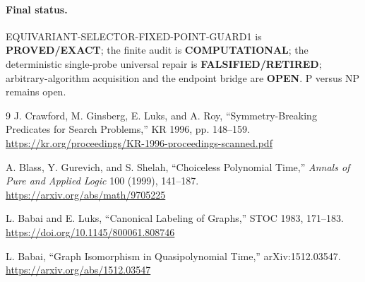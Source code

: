 \documentclass[11pt]{article}
\begin{document}
\paragraph{Final status.}
EQUIVARIANT-SELECTOR-FIXED-POINT-GUARD1 is \textbf{PROVED/EXACT}; the finite audit is \textbf{COMPUTATIONAL}; the deterministic single-probe universal repair is \textbf{FALSIFIED/RETIRED}; arbitrary-algorithm acquisition and the endpoint bridge are \textbf{OPEN}.  P versus NP remains open.

\begin{thebibliography}{9}
J. Crawford, M. Ginsberg, E. Luks, and A. Roy,
``Symmetry-Breaking Predicates for Search Problems,'' KR 1996, pp. 148--159.
\url{https://kr.org/proceedings/KR-1996-proceedings-scanned.pdf}

A. Blass, Y. Gurevich, and S. Shelah,
``Choiceless Polynomial Time,'' \emph{Annals of Pure and Applied Logic} 100 (1999), 141--187.
\url{https://arxiv.org/abs/math/9705225}

L. Babai and E. Luks,
``Canonical Labeling of Graphs,'' STOC 1983, 171--183.
\url{https://doi.org/10.1145/800061.808746}

L. Babai, ``Graph Isomorphism in Quasipolynomial Time,'' arXiv:1512.03547.
\url{https://arxiv.org/abs/1512.03547}
\end{thebibliography}

\end{document}
